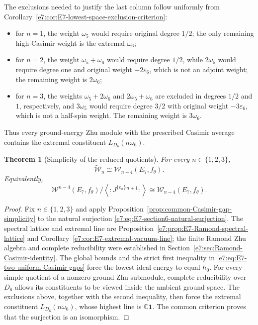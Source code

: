 \documentclass[11pt,reqno]{amsart}
\newtheorem{theorem}{Theorem}[section]
\theoremstyle{definition}
\theoremstyle{remark}
\begin{document}
The exclusions needed to justify the last column follow uniformly from
Corollary~\ref{e7:cor:E7-lowest-space-exclusion-criterion}:
\begin{itemize}
\item for $n=1$, the weight $\omega_5$ would require original degree
$1/2$; the only remaining high-Casimir weight is the extremal
$\omega_6$;
\item for $n=2$, the weight $\omega_5+\omega_6$ would require degree
$1/2$, while $2\omega_5$ would require degree one and original weight
$-2\varepsilon_6$, which is not an adjoint weight; the remaining weight is
$2\omega_6$;
\item for $n=3$, the weights $\omega_5+2\omega_6$ and
$2\omega_5+\omega_6$ are excluded in degrees $1/2$ and $1$, respectively,
and $3\omega_5$ would require degree $3/2$ with original weight
$-3\varepsilon_6$, which is not a half-spin weight.  The remaining weight
is $3\omega_6$.
\end{itemize}
Thus every ground-energy Zhu module with the prescribed Casimir average
contains the extremal constituent $L_{D_6}(n\omega_6)$.

\begin{theorem}[Simplicity of the reduced quotients]
\label{e7:thm:E7-reduced-quotients-simple}
For every $n\in\{1,2,3\}$,
\begin{equation*}
  \widetilde{\mathcal W}_n
  \cong
  \mathcal W_{n-4}(E_7,f_\theta).
\end{equation*}
Equivalently,
\begin{equation*}
  \mathcal W^{n-4}(E_7,f_\theta)
  \Big/
  \left\langle:J^{\{e_\vartheta\}}{}^{n+1}:\right\rangle
  \cong
  \mathcal W_{n-4}(E_7,f_\theta).
\end{equation*}
\end{theorem}

\begin{proof}
Fix $n\in\{1,2,3\}$ and apply
Proposition~\ref{prop:common-Casimir-gap-simplicity} to the natural
surjection \eqref{e7:eq:E7-section6-natural-surjection}.  The spectral
lattice and extremal line are
Proposition~\ref{e7:prop:E7-Ramond-spectral-lattice} and
Corollary~\ref{e7:cor:E7-extremal-vacuum-line}; the finite Ramond Zhu
algebra and complete reducibility were established in
Section~\ref{e7:sec:Ramond-Casimir-identity}.  The global bounds and the
strict first inequality in \eqref{e7:eq:E7-two-uniform-Casimir-gaps} force
the lowest ideal energy to equal $h_0$.  For every simple quotient of a
nonzero ground Zhu submodule, complete reducibility over $D_6$ allows its
constituents to be viewed inside the ambient ground space.  The exclusions
above, together with the second inequality, then force the extremal
constituent $L_{D_6}(n\omega_6)$, whose highest line is
$\mathbb C\mathbf1$.  The common criterion proves that the surjection is
an isomorphism.
\end{proof}
\end{document}
